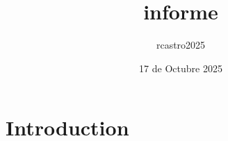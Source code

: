 \documentclass{article}
\title{informe}
\author{rcastro2025}
\date{17 de Octubre 2025}
\begin{document}
\maketitle

\section{Introduction}
\end{document}
